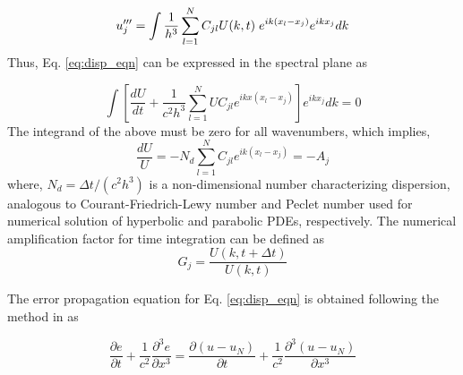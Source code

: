 \begin{equation} \label{3rd_der_num}
u'''_j = \int \frac{1}{h^3} \sum_{l=1}^N C_{jl} U(k,t) \hspace{1mm} e^{i k (x_l-x_j)} e^{i k x_j} dk
\end{equation}
Thus, Eq. \eqref{eq:disp_eqn} can be expressed in the spectral plane as 

\begin{equation}
\int \left[ \frac {d U}{d t} + \frac {1}{c^2h^3} \sum_{l=1}^N U C_{jl}
     e^{i k x(x_l-x_j)} \right] e^{i k x_j} dk = 0
\end{equation}
The integrand of the above must be zero for all wavenumbers, which implies,
\begin{equation}
\frac{dU}{U} = - N_d \sum \limits_{l=1}^{N} C_{jl} e^{i k (x_l-x_j)} = -A_j
\end{equation}
where, $N_d = \Delta t/(c^2h^3)$ is a non-dimensional number characterizing dispersion, analogous to Courant-Friedrich-Lewy number and Peclet number used for numerical solution of hyperbolic and parabolic PDEs, respectively. The numerical amplification factor for time integration can be defined as
\begin{equation*}
G_j = \frac{U(k,t + \Delta t)}{U(k,t)} 
\end{equation*}

The error propagation equation for Eq. \eqref{eq:disp_eqn} is obtained following the method in \cite{Sengupta2007} as 

\begin{equation} 
\label{eq:epe1}
\frac{\partial e}{\partial t} + \frac{1}{c^2} \frac{\partial^3 e}{\partial x^3} =\frac{\partial (u-u_N)}{\partial t} + \frac{1}{c^2} \frac{\partial^3 (u-u_N)}{\partial x^3} 
\end{equation}

